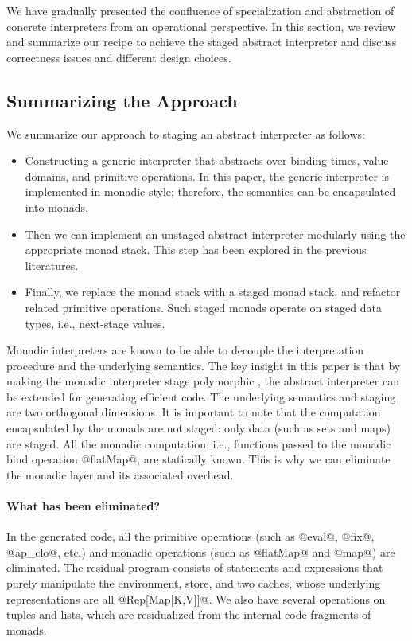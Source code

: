 We have gradually presented the confluence of specialization and abstraction of
concrete interpreters from an operational perspective.  In this section, we
review and summarize our recipe to achieve the staged abstract interpreter and
discuss correctness issues and different design choices.

\subsection{Summarizing the Approach}

We summarize our approach to staging an abstract interpreter as follows:

\begin{itemize}
  \item Constructing a generic interpreter that abstracts over binding times,
    value domains, and primitive operations. In this paper, the generic interpreter
    is implemented in monadic style; therefore, the semantics can be encapsulated
    into monads.
  \item Then we can implement an unstaged abstract interpreter modularly using
    the appropriate monad stack. This step has been explored in the previous
    literatures.
  \item Finally, we replace the monad stack with a staged monad stack, and
    refactor related primitive operations.  Such staged monads operate on
    staged data types, i.e., next-stage values.
\end{itemize}

Monadic interpreters are known to be able to decouple the interpretation
procedure and the underlying semantics. The key insight in this paper is that
by making the monadic interpreter stage polymorphic
\cite{Ofenbeck:2017:SGP:3136040.3136060, Amin:2017:CTI:3177123.3158140}, the
abstract interpreter can be extended for generating efficient code. The
underlying semantics and staging are two orthogonal dimensions. It is important
to note that the computation encapsulated by the monads are not staged: only
data (such as sets and maps) are staged. All the monadic computation, i.e.,
functions passed to the monadic bind operation @flatMap@, are statically known.
This is why we can eliminate the monadic layer and its associated overhead.

\paragraph{What has been eliminated?} In the generated code, all the
primitive operations (such as @eval@, @fix@, @ap_clo@, etc.) and monadic
operations (such as @flatMap@ and @map@) are eliminated. The residual program
consists of statements and expressions that purely manipulate the environment,
store, and two caches, whose underlying representations are all @Rep[Map[K,V]]@. We
also have several operations on tuples and lists, which are residualized from
the internal code fragments of monads. 


